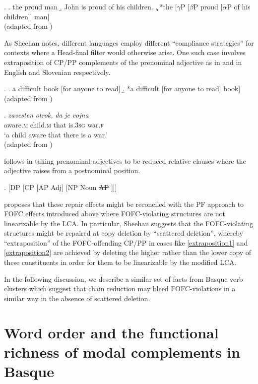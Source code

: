 \documentclass[output=paper]{langscibook}
\begin{document}
\exi. 
\a. the proud man
\b. John is proud of his children.
\c. *the [$\gamma$P [$\beta$P proud [$\alpha$P of his children]] man] \\
(adapted from \cite{williams1982})

As Sheehan notes, different languages employ different ``compliance strategies'' for contexts where a Head-final filter would otherwise arise.  One such case involves  extraposition of CP/PP complements of the prenominal adjective as in \Next and \NNext in English and Slovenian respectively.

\ex. \protect\label{extraposition1}
\a. a difficult book [for anyone to read]
\b. *a difficult [for anyone to read] book] \\
(adapted from \cite{sheehan2017})

\exg. \protect\label{extraposition2}\textit{zavesten} \textit{otrok,} \textit{da} \textit{je} \textit{vojna} \\
aware.\textsc{m} child.\textsc{m} that is.\textsc{3sg} war.\textsc{f}\\
`a child aware that there is a war.' \\
(adapted from \citep{sheehan2017})


\cite{sheehan2017} follows \cite{kayne1994} in taking prenominal adjectives to be reduced relative clauses where the adjective raises from a postnominal position. 

\exi. [DP [CP [AP Adj] [NP Noun \st{AP} ]]]


\cite{sheehan2017} proposes that these repair effects might be reconciled with the PF approach to FOFC effects introduced above where FOFC-violating structures are not linearizable by the LCA.  In particular, Sheehan  suggests that the FOFC-violating structures might be repaired at copy deletion by ``scattered deletion'', whereby  ``extraposition'' of the FOFC-offending CP/PP in cases like \protect\ref{extraposition1} and \protect\ref{extraposition2} are achieved by deleting the higher rather than the lower copy of these constituents in order for them to be linearizable by the modified LCA.

In the following discussion, we describe a similar set of facts from Basque verb clusters which suggest that chain reduction may bleed FOFC-violations in a similar way in the absence of scattered deletion.
	

\section{Word order and the functional richness of modal complements in Basque}
\end{document}
